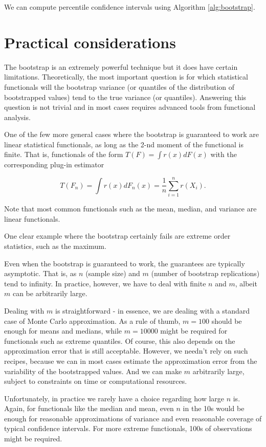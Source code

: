 \documentclass{book}
\theoremstyle{plain}%
\theoremstyle{definition}
\begin{document}
We can compute percentile confidence intervals using Algorithm \ref{alg:bootstrap}.

\section{Practical considerations}

The bootstrap is an extremely powerful technique but it does have certain limitations. Theoretically, the most important question is for which statistical functionals will the bootstrap variance (or quantiles of the distribution of bootstrapped values) tend to the true variance (or quantiles). Answering this question is not trivial and in most cases requires advanced tools from functional analysis.

One of the few more general cases where the bootstrap is guaranteed to work are linear statistical functionals, as long as the 2-nd moment of the functional is finite. That is, functionals of the form $T(F) = \int r(x) dF(x)$ with the corresponding plug-in estimator

$$T(F_n) = \int r(x)dF_n(x) = \frac{1}{n}\sum_{i=1}^n r(X_i).$$

Note that most common functionals such as the mean, median, and variance are linear functionals.

One clear example where the bootstrap certainly fails are extreme order statistics, such as the maximum.

Even when the bootstrap is guaranteed to work, the guarantees are typically asymptotic. That is, as $n$ (sample size) and $m$ (number of bootstrap replications) tend to infinity. In practice, however, we have to deal with finite $n$ and $m$, albeit $m$ can be arbitrarily large.

Dealing with $m$ is straightforward - in essence, we are dealing with a standard case of Monte Carlo approximation. As a rule of thumb, $m = 100$ should be enough for means and medians, while $m = 10000$ might be required for functionals such as extreme quantiles. Of course, this also depends on the approximation error that is still acceptable. However, we needn't rely on such recipes, because we can in most cases estimate the approximation error from the variability of the bootstrapped values. And we can make $m$ arbitrarily large, subject to constraints on time or computational resources.

Unfortunately, in practice we rarely have a choice regarding how large $n$ is. Again, for functionals like the median and mean, even $n$ in the 10s would be enough for reasonable approximations of variance and even reasonable coverage of typical confidence intervals. For more extreme functionals, 100s of observations might be required.
\end{document}
